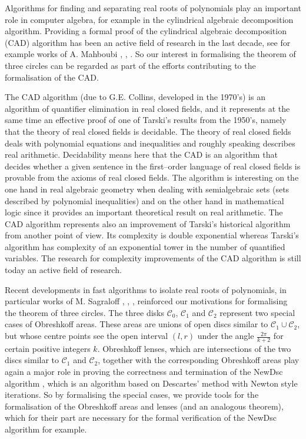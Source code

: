 \documentclass[11pt, a4paper]{article}
\newcommand{\ssc}{{\mathcal C}}
\begin{document}
Algorithms for finding and separating real roots of polynomials play an important role in computer algebra, for example in the cylindrical algebraic decomposition algorithm. Providing a formal proof of the cylindrical algebraic decomposition (CAD) algorithm has been an active field of research in the last decade, see for example works of A. Mahboubi \cite{mahboubi06}, \cite{mahboubi_phd}, \cite{mahboubi07}. So our interest in formalising the theorem of three circles can be regarded as part of the efforts contributing to the formalisation of the CAD.

The CAD algorithm (due to G.E. Collins, developed in the 1970's) is an algorithm of quantifier elimination in real closed fields, and it represents at the same time an effective proof of one of Tarski's results from the 1950's, namely that the theory of real closed fields is decidable. The theory of real closed fields deals with polynomial equations and inequalities and roughly speaking describes real arithmetic. Decidability means here that the CAD is an algorithm that decides whether a given sentence in the first--order language of real closed fields is provable from the axioms of real closed fields. The algorithm is interesting on the one hand in real algebraic geometry when dealing with semialgebraic sets (sets described by polynomial inequalities) and on the other hand in mathematical logic since it provides an important theoretical result on real arithmetic. The CAD algorithm represents also an improvement of Tarski's historical algorithm from another point of view. Its complexity is double exponential whereas Tarski's algorithm has complexity of an exponential tower in the number of quantified variables. The research for complexity improvements of the CAD algorithm is still today an active field of research.

Recent developments in fast algorithms to isolate real roots of polynomials, in particular works of M. Sagraloff \cite{sagraloff09}, \cite{sagraloff11}, \cite{sagraloff12}, reinforced our motivations for formalising the theorem of three circles.
The three disks $\ssc_0$, $\ssc_1$ and $\ssc_2$ represent two special cases of Obreshkoff areas. These areas are unions of open discs similar to $\ssc_1 \cup \ssc_2$, but whose centre points see the open interval $(l,r)$ under the angle $\frac{2 \pi}{k+2}$ for certain positive integers $k$. Obreshkoff lenses, which are intersections of the two discs similar to $\ssc_1$ and $\ssc_2$, together with the corresponding Obreshkoff areas play again a major role in proving the correctness and termination of the NewDsc algorithm \cite{sagraloff12}, which is an algorithm based on Descartes' method with Newton style iterations. So by formalising the special cases, we provide tools for the formalisation of the Obreshkoff areas and lenses (and an analogous theorem), which for their part are necessary for the formal verification of the NewDsc algorithm for example. 
\end{document}
